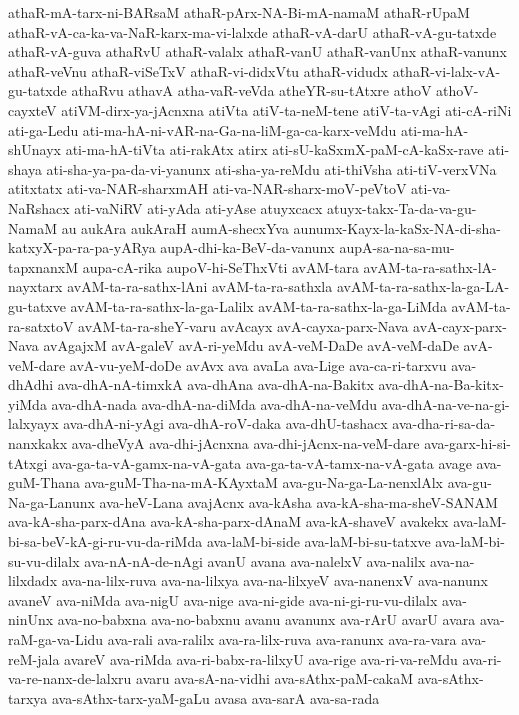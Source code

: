 {athaR-mA-tarx-ni-BARsaM
athaR-pArx-NA-Bi-mA-namaM
athaR-rUpaM
athaR-vA-ca-ka-va-NaR-karx-ma-vi-lalxde
athaR-vA-darU
athaR-vA-gu-tatxde
athaR-vA-guva
athaRvU
athaR-valalx
athaR-vanU
athaR-vanUnx
athaR-vanunx
athaR-veVnu
athaR-viSeTxV
athaR-vi-didxVtu
athaR-vidudx
athaR-vi-lalx-vA-gu-tatxde
athaRvu
athavA
atha-vaR-veVda
atheYR-su-tAtxre
athoV
athoV-cayxteV
atiVM-dirx-ya-jAcnxna
atiVta
atiV-ta-neM-tene
atiV-ta-vAgi
ati-cA-riNi
ati-ga-Ledu
ati-ma-hA-ni-vAR-na-Ga-na-liM-ga-ca-karx-veMdu
ati-ma-hA-shUnayx
ati-ma-hA-tiVta
ati-rakAtx
atirx
ati-sU-kaSxmX-paM-cA-kaSx-rave
ati-shaya
ati-sha-ya-pa-da-vi-yanunx
ati-sha-ya-reMdu
ati-thiVsha
ati-tiV-verxVNa
atitxtatx
ati-va-NAR-sharxmAH
ati-va-NAR-sharx-moV-peVtoV
ati-va-NaRshacx
ati-vaNiRV
ati-yAda
ati-yAse
atuyxcacx
atuyx-takx-Ta-da-va-gu-NamaM
au
aukAra
aukAraH
aumA-shecxYva
aunumx-Kayx-la-kaSx-NA-di-sha-katxyX-pa-ra-pa-yARya
aupA-dhi-ka-BeV-da-vanunx
aupA-sa-na-sa-mu-tapxnanxM
aupa-cA-rika
aupoV-hi-SeThxVti
avAM-tara
avAM-ta-ra-sathx-lA-nayxtarx
avAM-ta-ra-sathx-lAni
avAM-ta-ra-sathxla
avAM-ta-ra-sathx-la-ga-LA-gu-tatxve
avAM-ta-ra-sathx-la-ga-Lalilx
avAM-ta-ra-sathx-la-ga-LiMda
avAM-ta-ra-satxtoV
avAM-ta-ra-sheY-varu
avAcayx
avA-cayxa-parx-Nava
avA-cayx-parx-Nava
avAgajxM
avA-galeV
avA-ri-yeMdu
avA-veM-DaDe
avA-veM-daDe
avA-veM-dare
avA-vu-yeM-doDe
avAvx
ava
avaLa
ava-Lige
ava-ca-ri-tarxvu
ava-dhAdhi
ava-dhA-nA-timxkA
ava-dhAna
ava-dhA-na-Bakitx
ava-dhA-na-Ba-kitx-yiMda
ava-dhA-nada
ava-dhA-na-diMda
ava-dhA-na-veMdu
ava-dhA-na-ve-na-gi-lalxyayx
ava-dhA-ni-yAgi
ava-dhA-roV-daka
ava-dhU-tashacx
ava-dha-ri-sa-da-nanxkakx
ava-dheVyA
ava-dhi-jAcnxna
ava-dhi-jAcnx-na-veM-dare
ava-garx-hi-si-tAtxgi
ava-ga-ta-vA-gamx-na-vA-gata
ava-ga-ta-vA-tamx-na-vA-gata
avage
ava-guM-Thana
ava-guM-Tha-na-mA-KAyxtaM
ava-gu-Na-ga-La-nenxlAlx
ava-gu-Na-ga-Lanunx
ava-heV-Lana
avajAcnx
ava-kAsha
ava-kA-sha-ma-sheV-SANAM
ava-kA-sha-parx-dAna
ava-kA-sha-parx-dAnaM
ava-kA-shaveV
avakekx
ava-laM-bi-sa-beV-kA-gi-ru-vu-da-riMda
ava-laM-bi-side
ava-laM-bi-su-tatxve
ava-laM-bi-su-vu-dilalx
ava-nA-nA-de-nAgi
avanU
avana
ava-nalelxV
ava-nalilx
ava-na-lilxdadx
ava-na-lilx-ruva
ava-na-lilxya
ava-na-lilxyeV
ava-nanenxV
ava-nanunx
avaneV
ava-niMda
ava-nigU
ava-nige
ava-ni-gide
ava-ni-gi-ru-vu-dilalx
ava-ninUnx
ava-no-babxna
ava-no-babxnu
avanu
avanunx
ava-rArU
avarU
avara
ava-raM-ga-va-Lidu
ava-rali
ava-ralilx
ava-ra-lilx-ruva
ava-ranunx
ava-ra-vara
ava-reM-jala
avareV
ava-riMda
ava-ri-babx-ra-lilxyU
ava-rige
ava-ri-va-reMdu
ava-ri-va-re-nanx-de-lalxru
avaru
ava-sA-na-vidhi
ava-sAthx-paM-cakaM
ava-sAthx-tarxya
ava-sAthx-tarx-yaM-gaLu
avasa
ava-sarA
ava-sa-rada
}
